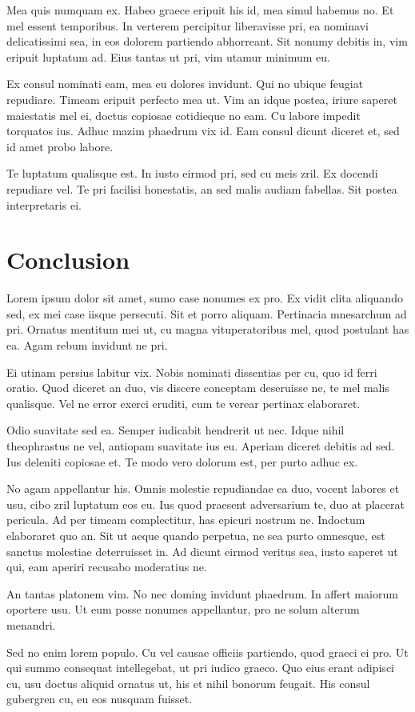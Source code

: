 \documentclass{article}
\begin{document}
Mea quis numquam ex. Habeo graece eripuit his id, mea simul habemus no. Et mel essent temporibus. In verterem percipitur liberavisse pri, ea nominavi delicatissimi sea, in eos dolorem partiendo abhorreant. Sit nonumy debitis in, vim eripuit luptatum ad. Eius tantas ut pri, vim utamur minimum eu.

Ex consul nominati eam, mea eu dolores invidunt. Qui no ubique feugiat repudiare. Timeam eripuit perfecto mea ut. Vim an idque postea, iriure saperet maiestatis mel ei, doctus copiosae cotidieque no eam. Cu labore impedit torquatos ius. Adhuc mazim phaedrum vix id. Eam consul dicunt diceret et, sed id amet probo labore.

Te luptatum qualisque est. In iusto eirmod pri, sed cu meis zril. Ex docendi repudiare vel. Te pri facilisi honestatis, an sed malis audiam fabellas. Sit postea interpretaris ei.
\section{Conclusion}
Lorem ipsum dolor sit amet, sumo case nonumes ex pro. Ex vidit clita aliquando sed, ex mei case iisque persecuti. Sit et porro aliquam. Pertinacia mnesarchum ad pri. Ornatus mentitum mei ut, cu magna vituperatoribus mel, quod postulant has ea. Agam rebum invidunt ne pri.

Ei utinam persius labitur vix. Nobis nominati dissentias per cu, quo id ferri oratio. Quod diceret an duo, vis discere conceptam deseruisse ne, te mel malis qualisque. Vel ne error exerci eruditi, cum te verear pertinax elaboraret.

Odio suavitate sed ea. Semper iudicabit hendrerit ut nec. Idque nihil theophrastus ne vel, antiopam suavitate ius eu. Aperiam diceret debitis ad sed. Ius deleniti copiosae et. Te modo vero dolorum est, per purto adhuc ex.

No agam appellantur his. Omnis molestie repudiandae ea duo, vocent labores et usu, cibo zril luptatum eos eu. Ius quod praesent adversarium te, duo at placerat pericula. Ad per timeam complectitur, has epicuri nostrum ne. Indoctum elaboraret quo an. Sit ut aeque quando perpetua, ne sea purto omnesque, est sanctus molestiae deterruisset in. Ad dicunt eirmod veritus sea, iusto saperet ut qui, eam aperiri recusabo moderatius ne.

An tantas platonem vim. No nec doming invidunt phaedrum. In affert maiorum oportere usu. Ut eum posse nonumes appellantur, pro ne solum alterum menandri.

Sed no enim lorem populo. Cu vel causae officiis partiendo, quod graeci ei pro. Ut qui summo consequat intellegebat, ut pri iudico graeco. Quo eius erant adipisci cu, usu doctus aliquid ornatus ut, his et nihil bonorum feugait. His consul gubergren cu, eu eos nusquam fuisset.
\end{document}
